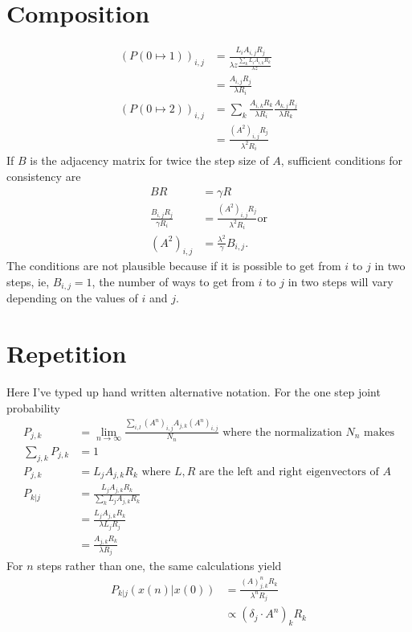 \documentclass[12pt]{article} \usepackage{amsmath,amsfonts}
\begin{document}
\section{Composition}
\label{sec:composition}

\begin{align*}
  \left( P(0\mapsto 1) \right)_{i,j} &= \frac{L_i A_{i,j} R_j}
    {\lambda z \frac{\sum_k L_i A_{i,k} R_k}{\lambda z}} \\
  &= \frac{A_{i,j} R_j}{\lambda R_i} \\
  \left( P(0\mapsto 2) \right)_{i,j} &=
     \sum_k \frac{A_{i,k} R_k}{\lambda R_i}
            \frac{A_{k,j} R_j}{\lambda R_k} \\
  &= \frac{(A^2)_{i,j} R_j}{\lambda^2 R_i}                                       
\end{align*}
If $B$ is the adjacency matrix for twice the step size of $A$,
sufficient conditions for consistency are
\begin{align*}
  B R &= \gamma R \\
  \frac{B_{i,j} R_j}{\gamma R_i} &= \frac{(A^2)_{i,j} R_j}{\lambda^2
                                   R_i} \text{or}\\
  (A^2)_{i,j} &= \frac{\lambda^2}{\gamma} B_{i,j}.
\end{align*}
The conditions are not plausible because if it is possible to get from
$i$ to $j$ in two steps, ie, $B_{i,j}=1$, the number of ways to get
from $i$ to $j$ in two steps will vary depending on the values of $i$
and $j$.

\section{Repetition}
\label{sec:repetition}

Here I've typed up hand written alternative notation.  For the one
step joint probability
\begin{align*}
  P_{j,k} &= \lim_{n\rightarrow \infty} \frac {\sum_{i,l} \left(A^n
            \right)_{i,j} A_{j,k}  \left(A^n \right)_{i,j} }{N_n}
            \text{ where the normalization } N_n \text{ makes} \\
  \sum_{j,k}P_{j,k} &= 1   \\
  P_{j,k} &= L_j A_{j,k} R_k \text{ where } L,R \text{ are the left and right
    eigenvectors of } A \\
  P_{k|j} &= \frac{L_j A_{j,k} R_k}{\sum_k L_j A_{j,k} R_k} \\
  &= \frac{L_j A_{j,k} R_k}{\lambda L_j R_j} \\
  &= \frac{A_{j,k} R_k}{\lambda R_j}
\end{align*}
For $n$ steps rather than one, the same calculations yield
\begin{align*}
  P_{k|j}(x(n)|x(0)) &= \frac{\left( A \right)^n_{j,k} R_k}{\lambda^n
                       R_j} \\
  &\propto \left( \delta_j \cdot A^n \right)_k R_k
\end{align*}
\end{document}
